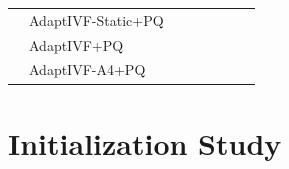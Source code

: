 \begin{table}[t]
\begin{tabular}{llrrrrrr}
 & AdaptIVF-Static+PQ & \placeholder{\_\_\_} & \placeholder{\_\_\_} & \placeholder{\_\_\_} & \placeholder{\_\_\_} & \placeholder{\_\_\_} & \placeholder{\_\_\_} \\
 & AdaptIVF+PQ        & \placeholder{\_\_\_} & \placeholder{\_\_\_} & \placeholder{\_\_\_} & \placeholder{\_\_\_} & \placeholder{\_\_\_} & \placeholder{\_\_\_} \\
 & AdaptIVF-A4+PQ     & \placeholder{\_\_\_} & \placeholder{\_\_\_} & \placeholder{\_\_\_} & \placeholder{\_\_\_} & \placeholder{\_\_\_} & \placeholder{\_\_\_} \\
\bottomrule
\end{tabular}
\end{table}


\section{Initialization Study}
\label{sec:appendix:initialization}

